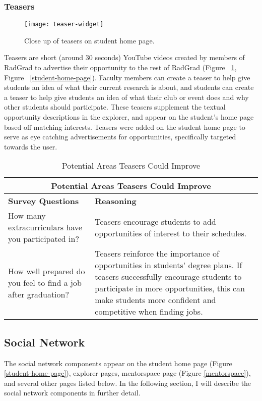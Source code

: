 \subsubsection{Teasers}

\begin{figure}[htbp!]
\centering
\texttt{[image: teaser-widget]}
\caption{Close up of teasers on student home page.}
\label{teasers}
\end{figure}
Teasers are short (around 30 seconds) YouTube videos created by members of RadGrad to advertise their opportunity to the rest of RadGrad (Figure ~\ref{teasers}, Figure ~\ref{student-home-page}). Faculty members can create a teaser to help give students an idea of what their current research is about, and students can create a teaser to help give students an idea of what their club or event does and why other students should participate. These teasers supplement the textual opportunity descriptions in the explorer, and appear on the student's home page based off matching interests. Teasers were added on the student home page to serve as eye catching advertisements for opportunities, specifically targeted towards the user.

\begin{table}[htbp!]
\centering
\begin{tabular}{  |p{4cm}|p{12cm}| } 
\hline
 \multicolumn{2}{|c|}{Potential Areas Teasers Could Improve}\\
\hline
 \textbf{Survey Questions} & \textbf{Reasoning} \\ 
  \hline
  How many extracurriculars have you participated in? & Teasers encourage students to add  opportunities of interest to their schedules.\\
  \hline
  How well prepared do you feel to find a job after graduation? & Teasers reinforce the importance of opportunities in students' degree plans.  If teasers successfully encourage students to participate in more opportunities, this can make students more confident and competitive when finding jobs.\\
  \hline
\end{tabular}
 \caption{Potential Areas Teasers Could Improve}
\end{table}

\subsection{Social Network}

The social network components appear on the student home page (Figure \ref{student-home-page}), explorer pages, mentorspace page (Figure \ref{mentorspace}), and several other pages listed below. In the following section, I will describe the social network components in further detail. 

